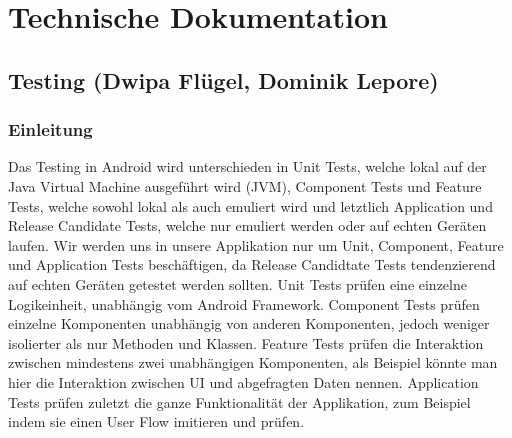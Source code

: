 \documentclass{article}
\begin{document}
\newpage

\section{Technische Dokumentation}
\subsection{Testing \small{(Dwipa Flügel, Dominik Lepore)}}
\subsubsection{Einleitung}

Das Testing in Android wird unterschieden in Unit Tests, welche lokal auf der Java Virtual Machine ausgeführt wird (JVM), Component Tests und Feature Tests, welche sowohl lokal als auch emuliert wird und letztlich Application und Release Candidate Tests, welche nur emuliert werden oder auf echten Geräten laufen. Wir werden uns in unsere Applikation nur um Unit, Component, Feature und Application Tests beschäftigen, da Release Candidtate Tests tendenzierend auf echten Geräten getestet werden sollten. Unit Tests prüfen eine einzelne Logikeinheit, unabhängig vom Android Framework. Component Tests prüfen einzelne Komponenten unabhängig von anderen Komponenten, jedoch weniger isolierter als nur Methoden und Klassen. Feature Tests prüfen die Interaktion zwischen mindestens zwei unabhängigen Komponenten, als Beispiel könnte man hier die Interaktion zwischen UI und abgefragten Daten nennen. Application Tests prüfen zuletzt die ganze Funktionalität der Applikation, zum Beispiel indem sie einen User Flow imitieren und prüfen.
\end{document}

